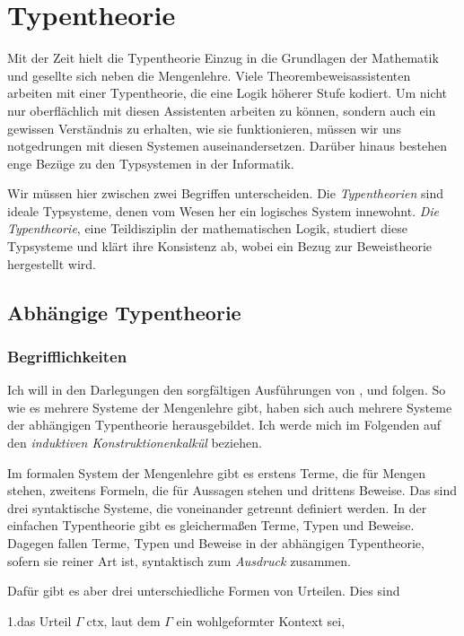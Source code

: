 
\chapter{Typentheorie}

Mit der Zeit hielt die Typentheorie Einzug in die Grundlagen der Mathematik
und gesellte sich neben die Mengenlehre. Viele Theorembeweisassistenten
arbeiten mit einer Typentheorie, die eine Logik höherer Stufe kodiert.
Um nicht nur oberflächlich mit diesen Assistenten arbeiten zu können, sondern
auch ein gewissen Verständnis zu erhalten, wie sie funktionieren, müssen wir
uns notgedrungen mit diesen Systemen auseinandersetzen. Darüber hinaus
bestehen enge Bezüge zu den Typsystemen in der Informatik.

Wir müssen hier zwischen zwei Begriffen unterscheiden. Die \emph{Typentheorien}
sind ideale Typsysteme, denen vom Wesen her ein logisches System innewohnt.
\emph{Die Typentheorie}, eine Teildisziplin der mathematischen Logik, studiert
diese Typsysteme und klärt ihre Konsistenz ab, wobei ein Bezug zur
Beweistheorie hergestellt wird.

\section{Abhängige Typentheorie}

\subsection{Begrifflichkeiten}

Ich will in den Darlegungen den sorgfältigen Ausführungen von
\cite{Avigad}, \cite{Mimram} und \cite{HoTT} folgen. So wie es mehrere
Systeme der Mengenlehre gibt, haben sich auch mehrere Systeme der
abhängigen Typentheorie herausgebildet. Ich werde mich im Folgenden
auf den \emph{induktiven Konstruktionenkalkül} beziehen.

Im formalen System der Mengenlehre gibt es erstens Terme, die für Mengen
stehen, zweitens Formeln, die für Aussagen stehen und drittens Beweise.
Das sind drei syntaktische Systeme, die voneinander getrennt definiert
werden. In der einfachen Typentheorie gibt es gleichermaßen Terme, Typen und
Beweise. Dagegen fallen Terme, Typen und Beweise in der abhängigen
Typentheorie, sofern sie reiner Art ist, syntaktisch zum \emph{Ausdruck}
zusammen.

Dafür gibt es aber drei unterschiedliche Formen von Urteilen.%
 Dies sind

1.\;das Urteil $\Gamma\;\mathrm{ctx}$, laut dem $\Gamma$ ein
wohlgeformter Kontext sei,

